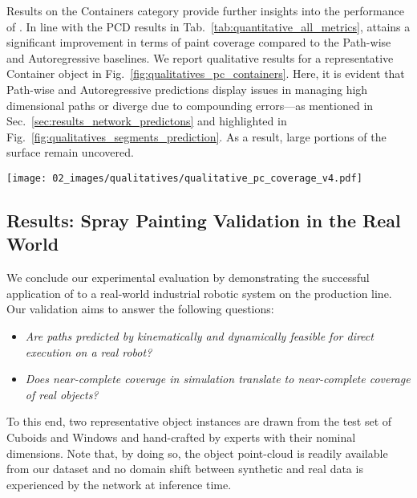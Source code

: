 Results on the Containers category provide further insights into the performance of \ours.
In line with the PCD results in Tab.~\ref{tab:quantitative_all_metrics}, \ours attains a significant improvement in terms of paint coverage compared to the Path-wise and Autoregressive baselines.
We report qualitative results for a representative Container object in Fig.~\ref{fig:qualitatives_pc_containers}.
%
Here, it is evident that Path-wise and Autoregressive predictions display issues in managing high dimensional paths or diverge due to compounding errors---as mentioned in Sec.~\ref{sec:results_network_predictons} and highlighted in Fig.~\ref{fig:qualitatives_segments_prediction}. 
As a result, large portions of the surface remain uncovered. 

\begin{figure*}[!t]
    \centering
    \texttt{[image: 02\_images/qualitatives/qualitative\_pc\_coverage\_v4.pdf]}
    \vspace{-16pt}
    \caption{
    Qualitative paint coverage results in simulation on a representative test instance of the Containers category.
    }
    \label{fig:qualitatives_pc_containers}
\end{figure*}



\subsection{Results: Spray Painting Validation in the Real World}
\label{sec:real_world_exps}
We conclude our experimental evaluation by demonstrating the successful application of \ours to a real-world industrial robotic system on the production line. 
%
Our validation aims to answer the following questions:
\begin{itemize}
    \item \emph{Are paths predicted by \ours kinematically and dynamically feasible for direct execution on a real robot?}
    \item \emph{Does near-complete coverage in simulation translate to near-complete coverage of real objects?}
\end{itemize}
%
To this end, two representative object instances are drawn from the test set of Cuboids and Windows and hand-crafted by experts with their nominal dimensions.
Note that, by doing so, the object point-cloud is readily available from our dataset and no domain shift between synthetic and real data is experienced by the network at inference time.

